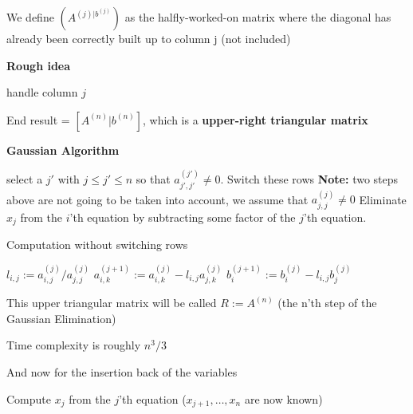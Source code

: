 \documentclass{article}
\begin{document}
We define $(A^{(j)|b^(j)})$ as the halfly-worked-on matrix where the diagonal has already been correctly built up to column j (not included)

\textbf{Rough idea}
\begin{algorithm}[H]
\caption{Rough idea}
\begin{algorithmic}[1]
  \State handle column $j$
\EndFor
\end{algorithmic}
\end{algorithm}

End result = $[A^{(n)}|b^{(n)}]$, which is a \textbf{upper-right triangular matrix}

\textbf{Gaussian Algorithm}
\begin{algorithm}[H]
\caption{Gaussian Algorithm}
\begin{algorithmic}[1]
  \State select a $j'$ with $j \le j' \le n$ so that $a_{j',j'}^{(j')} \ne 0$.
  \State Switch these rows
  \State \textbf{Note:} two steps above are not going to be taken into account, we assume that $a_{j,j}^{(j)} \ne 0$
    \State Eliminate $x_j$ from the $i$'th equation by subtracting some factor of the $j$'th equation.
  \EndFor
\EndFor
\end{algorithmic}
\end{algorithm}

Computation without switching rows
\begin{algorithm}[H]
\caption{Algorithm without switching rows}
\begin{algorithmic}[1]
    \State $l_{i,j} := a_{i,j}^{(j)} / a_{j,j}^{(j)}$
      \State $a_{i,k}^{(j+1)} := a_{i,k}^{(j)} - l_{i,j}a_{j,k}^{(j)}$
    \EndFor
    \State $b_{i}^{(j+1)} := b_{i}^{(j)} - l_{i,j}b_{j}^{(j)}$
  \EndFor
\EndFor
\end{algorithmic}
\end{algorithm}

This upper triangular matrix will be called $R := A^{(n)}$ (the n'th step of the Gaussian Elimination)

Time complexity is roughly $n^3 /3$

And now for the insertion back of the variables
\begin{algorithm}[H]
\caption{Insertion back of the variables}
\begin{algorithmic}[1]
  \State Compute $x_j$ from the $j$'th equation ($x_{j+1},\dots,x_n$ are now known)
\EndFor
\end{algorithmic}
\end{algorithm}
\end{document}
